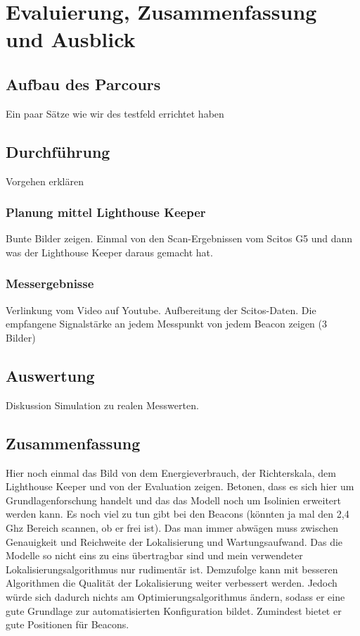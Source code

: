 \chapter{Evaluierung, Zusammenfassung und Ausblick}

\section{Aufbau des Parcours}
Ein paar Sätze wie wir des testfeld errichtet haben 

\section{Durchführung}
Vorgehen erklären
\subsection{Planung mittel Lighthouse Keeper}
Bunte Bilder zeigen. Einmal von den Scan-Ergebnissen vom Scitos G5 und dann was der Lighthouse Keeper daraus gemacht hat.
\subsection{Messergebnisse}
Verlinkung vom Video auf Youtube. Aufbereitung der Scitos-Daten. Die empfangene Signalstärke an jedem Messpunkt von jedem Beacon zeigen (3 Bilder)

\section{Auswertung}
Diskussion Simulation zu realen Messwerten.

\section{Zusammenfassung}
Hier noch einmal das Bild von dem Energieverbrauch, der Richterskala, dem Lighthouse Keeper und von der Evaluation zeigen. Betonen, dass es sich hier um Grundlagenforschung handelt und das das Modell noch um Isolinien erweitert werden kann. Es noch viel zu tun gibt bei den Beacons (könnten ja mal den 2,4 Ghz Bereich scannen, ob er frei ist). Das man immer abwägen muss zwischen Genauigkeit und Reichweite der Lokalisierung und Wartungsaufwand. Das die Modelle so nicht eins zu eins übertragbar sind und mein verwendeter Lokalisierungsalgorithmus nur rudimentär ist. Demzufolge kann mit besseren Algorithmen die Qualität der Lokalisierung weiter verbessert werden. Jedoch würde sich dadurch nichts am Optimierungsalgorithmus ändern, sodass er eine gute Grundlage zur automatisierten Konfiguration bildet. Zumindest bietet er gute Positionen für Beacons. 

